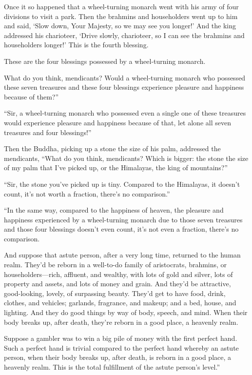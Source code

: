 \documentclass[12pt,openany]{book}%
\begin{document}
Once it so happened that a wheel-turning monarch went with his army of four divisions to visit a park. Then the brahmins and householders went up to him and said, ‘Slow down, Your Majesty, so we may see you longer!’ And the king addressed his charioteer, ‘Drive slowly, charioteer, so I can see the brahmins and householders longer!’ This is the fourth blessing. 

These are the four blessings possessed by a wheel-turning monarch. 

What do you think, mendicants? Would a wheel-turning monarch who possessed these seven treasures and these four blessings experience pleasure and happiness because of them?” 

“Sir, a wheel-turning monarch who possessed even a single one of these treasures would experience pleasure and happiness because of that, let alone all seven treasures and four blessings!” 

Then the Buddha, picking up a stone the size of his palm, addressed the mendicants, “What do you think, mendicants? Which is bigger: the stone the size of my palm that I’ve picked up, or the Himalayas, the king of mountains?” 

“Sir, the stone you’ve picked up is tiny. Compared to the Himalayas, it doesn’t count, it’s not worth a fraction, there’s no comparison.” 

“In the same way, compared to the happiness of heaven, the pleasure and happiness experienced by a wheel-turning monarch due to those seven treasures and those four blessings doesn’t even count, it’s not even a fraction, there’s no comparison. 

And suppose that astute person, after a very long time, returned to the human realm. They’d be reborn in a well-to-do family of aristocrats, brahmins, or householders—rich, affluent, and wealthy, with lots of gold and silver, lots of property and assets, and lots of money and grain. And they’d be attractive, good-looking, lovely, of surpassing beauty. They’d get to have food, drink, clothes, and vehicles; garlands, fragrance, and makeup; and a bed, house, and lighting. And they do good things by way of body, speech, and mind. When their body breaks up, after death, they’re reborn in a good place, a heavenly realm. 

Suppose a gambler was to win a big pile of money with the first perfect hand. Such a perfect hand is trivial compared to the perfect hand whereby an astute person, when their body breaks up, after death, is reborn in a good place, a heavenly realm. This is the total fulfillment of the astute person’s level.” 
\end{document}

